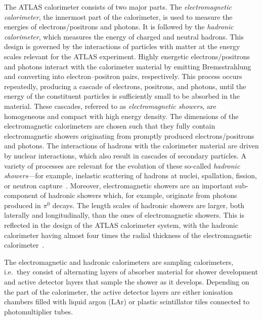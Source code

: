 The ATLAS calorimeter consists of two major parts. The \emph{electromagnetic
  calorimeter}, the innermost part of the calorimeter, is used to measure the
energies of electrons/positrons and photons. It is followed by the
\emph{hadronic calorimeter}, which measures the energy of charged and neutral
hadrons.
This design is governed by the interactions of particles with matter at the
energy scales relevant for the ATLAS experiment. Highly energetic
electrons/positrons and photons interact with the calorimeter material by
emitting Bremsstrahlung and converting into electron--positron pairs,
respectively. This process occurs repeatedly, producing a cascade of electrons,
positrons, and photons, until the energy of the constituent particles is
sufficiently small to be absorbed in the material. These cascades, referred to
as \emph{electromagnetic showers}, are homogeneous and compact with high energy
density. The dimensions of the electromagnetic calorimeters are chosen such that
they fully contain electromagnetic showers originating from promptly produced
electrons/positrons and photons. The interactions of hadrons with the
calorimeter material are driven by nuclear interactions, which also result in
cascades of secondary particles. A variety of processes are relevant for the
evolution of these so-called \emph{hadronic showers}---for example, inelastic
scattering of hadrons at nuclei, spallation, fission, or neutron
capture~\cite{Kolanoski:2016gyf}. Moreover, electromagnetic showers are an
important sub-component of hadronic showers which, for example, originate from
photons produced in $\pi^0$ decays. The length scales of hadronic showers are
larger, both laterally and longitudinally, than the ones of electromagnetic
showers.
This is reflected in the design of the ATLAS calorimeter system, with the
hadronic calorimeter having almost four times the radial thickness of the
electromagnetic calorimeter~\cite{ATLAS-TDR-02,ATLAS-TDR-03}.

The electromagnetic and hadronic calorimeters are sampling calorimeters, i.e.\
they consist of alternating layers of absorber material for shower development
and active detector layers that sample the shower as it develops. Depending on
the part of the calorimeter, the active detector layers are either ionisation
chambers filled with liquid argon (LAr) or plastic scintillator tiles connected
to photomultiplier tubes.


